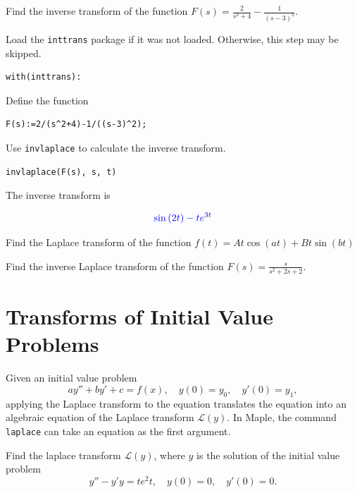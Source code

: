 \documentclass[
  12pt]{elegantbook}
\begin{document}
\begin{example}
Find the inverse transform of the function \(F(s)=\frac{2}{s^2+4}-\frac{1}{(s-3)^2}\).
\end{example}

\begin{solution}
Load the \texttt{inttrans} package if it was not loaded. Otherwise, this step may be skipped.

\begin{verbatim}
with(inttrans):
\end{verbatim}

Define the function

\begin{verbatim}
F(s):=2/(s^2+4)-1/((s-3)^2);
\end{verbatim}

Use \texttt{invlaplace} to calculate the inverse transform.

\begin{verbatim}
invlaplace(F(s), s, t)
\end{verbatim}

The inverse transform is

\[{\color{blue}{\sin \left(2 t \right)-t e^{3 t}}}\]
\end{solution}

\begin{exercise}
Find the Laplace transform of the function \(f(t)=At\cos(a t)+Bt\sin(b t)\)
\end{exercise}

\begin{exercise}
Find the inverse Laplace transform of the function \(F(s)=\frac{s}{s^2+2s+2}\).
\end{exercise}

\hypertarget{transforms-of-initial-value-problems}{%
\section{Transforms of Initial Value Problems}\label{transforms-of-initial-value-problems}}

Given an initial value problem
\[ay''+by'+c=f(x), \quad y(0)=y_0,\quad y'(0)=y_1,\]
applying the Laplace transform to the equation translates the equation into an algebraic equation of the Laplace transform \(\mathcal{L}(y)\). In Maple, the command \texttt{laplace} can take an equation as the first argument.

\begin{example}
Find the laplace transform \(\mathcal{L}(y)\), where \(y\) is the solution of the initial value problem
\[y''-y'y=te^2t, \quad y(0)=0, \quad y'(0)=0.\]
\end{example}
\end{document}
